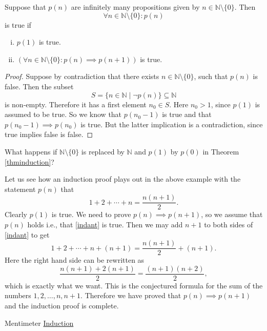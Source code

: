 \begin{tcolorbox}\begin{theorem}\label{thminduction}
    Suppose that $p(n)$ are infinitely many propositions given by $n\in \mathbb{N}\setminus\{0\}$. Then
    $$
      \forall n\in \mathbb{N}\setminus\{0\}: p(n)
    $$
    is true if
    \begin{enumerate}[(i)]
      \item
            $p(1)$ is true.
      \item
            $\left(\forall n\in \mathbb{N}\setminus\{0\}: p(n)\implies p(n+1)\right)$ is true.
    \end{enumerate}
  \end{theorem}\end{tcolorbox}

\begin{proof}
  Suppose by contradiction that there exists $n\in \mathbb{N}\setminus\{0\}$, such that
  $p(n)$ is false. Then the subset
  $$
    S = \{n\in \mathbb{N} \mid \neg p(n)\}\subseteq \mathbb{N}
  $$
  is non-empty. Therefore it has a first element $n_0\in S$.
  Here $n_0 > 1$, since $p(1)$ is assumed to be true. So we
  know that $p(n_0-1)$ is true and that
  $p(n_0-1)\implies p(n_0)$ is true. But the latter
  implication is a contradiction, since true implies
  false is false.
\end{proof}

\begin{exercise}
  What happens if $\mathbb{N}\setminus\{0\}$ is replaced by $\mathbb{N}$ and $p(1)$ by $p(0)$ in Theorem \ref{thminduction}?
\end{exercise}

Let us see how an induction proof plays out in the above example
with the statement $p(n)$ that
\begin{equation}\label{indant}
  1 + 2 + \cdots + n = \frac{n(n+1)}{2}.
\end{equation}
Clearly $p(1)$ is true. We need to prove $p(n)\implies p(n+1)$, so
we assume that $p(n)$ holds i.e., that \eqref{indant} is true.
Then we may add $n+1$ to both sides of \eqref{indant} to get
$$
  1 + 2 + \cdots + n + (n+1) = \frac{n(n+1)}{2} + (n+1).
$$
Here the right hand side can be rewritten as
$$
  \frac{n(n+1) + 2(n+1)}{2} = \frac{(n+1)(n+2)}{2},
$$
which is exactly what we want. This is the conjectured formula for
the sum of the numbers $1, 2, \dots, n, n+1$. Therefore
we have proved that $p(n)\implies p(n+1)$ and the induction
proof is complete.

\begin{button}{Mentimeter}
  \href{https://www.mentimeter.com/s/549726c25544d09c6c63762386ab2b03/712ca4c01dc4}{Induction}
\end{button}

